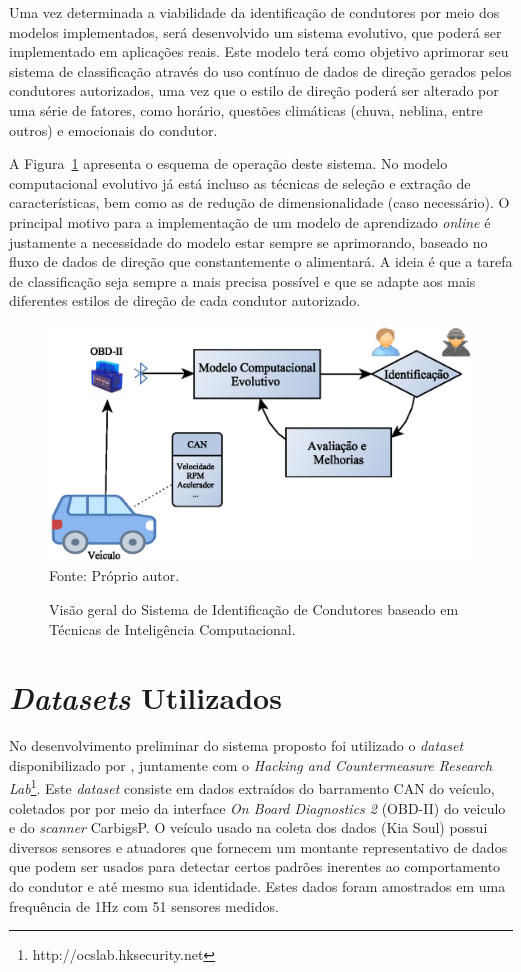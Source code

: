 Uma vez determinada a viabilidade da identificação de condutores por meio dos modelos implementados, será desenvolvido um sistema evolutivo, que poderá ser implementado em aplicações reais. Este modelo terá como objetivo aprimorar seu sistema de classificação através do uso contínuo de dados de direção gerados pelos condutores autorizados, uma vez que o estilo de direção poderá ser alterado por uma série de fatores, como horário, questões climáticas (chuva, neblina, entre outros) e emocionais do condutor.

A Figura~\ref{fig:flux2} apresenta o esquema de operação deste sistema. No modelo computacional evolutivo já está incluso as técnicas de seleção e extração de características, bem como as de redução de dimensionalidade (caso necessário). O principal motivo para a implementação de um modelo de aprendizado \textit{online} é justamente a necessidade do modelo estar sempre se aprimorando, baseado no fluxo de dados de direção que constantemente o alimentará. A ideia é que a tarefa de classificação seja sempre a mais precisa possível e que se adapte aos mais diferentes estilos de direção de cada condutor autorizado.


\begin{figure}[!htb]
	\centering
	\caption{Visão geral do Sistema de Identificação de Condutores baseado em Técnicas de Inteligência Computacional.} %
	\includegraphics[width=0.7\linewidth]{FLUX_parte2.eps}\\ 
	{\small Fonte: Próprio autor.} %
	\label{fig:flux2} %
\end{figure}


\section{\textit{Datasets} Utilizados}

No desenvolvimento preliminar do sistema proposto foi utilizado o \textit{dataset} disponibilizado por , juntamente com o \textit{Hacking and Countermeasure Research Lab}\footnote[1]{http://ocslab.hksecurity.net}. Este \textit{dataset} consiste em dados extraídos do barramento CAN do veículo, coletados por por meio da interface \textit{On Board Diagnostics 2} (OBD-II) do veiculo e do \textit{scanner} CarbigsP. O veículo usado na coleta dos dados (Kia Soul) possui diversos sensores e atuadores que fornecem um montante representativo de dados que podem ser usados para detectar certos padrões inerentes ao comportamento do condutor e até mesmo sua identidade. Estes dados foram amostrados em uma frequência de 1Hz com 51 sensores medidos.


